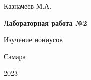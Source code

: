 \begin{titlepage}
	\begin{center}
		\Large{Казначеев М.А.}
	\end{center}
	\vspace*{\fill}
	\begin{center}
		\LARGE\textbf{Лабораторная работа №2}
		
		\addvspace{1em}
		
		\Large{Изучение нониусов}
		
	\end{center}
	\vspace*{\fill}
	\begin{center}
		\large{Самара}
		
		\large{2023}
	\end{center}
\end{titlepage}